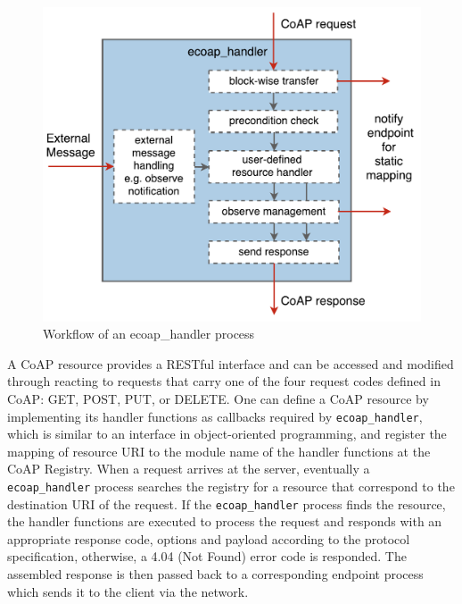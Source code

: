 \begin{figure}[!htbp]
\centering
\includegraphics[scale = 0.55]{ecoap_handler}
\caption{Workflow of an ecoap\_handler process}
\label{fig:ecoap_handler}
\end{figure}

A CoAP resource provides a RESTful interface and can be accessed and modified through reacting to requests that carry one of the four request codes defined in CoAP: GET, POST, PUT, or DELETE. One can define a CoAP resource by implementing its handler functions as callbacks required by \verb|ecoap_handler|, which is similar to an interface in object-oriented programming, and register the mapping of resource URI to the module name of the handler functions at the CoAP Registry. When a request arrives at the server, eventually a \verb|ecoap_handler| process searches the registry for a resource that correspond to the destination URI of the request. If the \verb|ecoap_handler| process finds the resource, the handler functions are executed to process the request and responds with an appropriate response code, options and payload according to the protocol specification, otherwise, a 4.04 (Not Found) error code is responded. The assembled response is then passed back to a corresponding endpoint process which sends it to the client via the network. 

